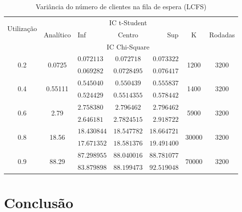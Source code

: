 \documentclass[a4paper]{article}
\begin{document}
\begin{table}[h!]
    \centering
    \begin{tabular}{|c|c|lcr|c|c|}\hline
        \multirow{2}{4.35em}{Utilização}
            & \multirow{3}{3.95em}{Analítico}
            & \multicolumn{3}{|c|}{IC t-Student}
            & \multirow{3}{1em}{K}
            & \multirow{3}{3.75em}{Rodadas} \\
        && Inf & Centro & Sup &&\\
        && \multicolumn{3}{|c|}{IC Chi-Square} &&\\\hline
        \multirow{2}{2em}{0.2}
            &\multirow{2}{3em}{0.0725}
            &$ 0.072113 $&$ 0.072718 $&$ 0.073322 $
            &\multirow{2}{2em}{1200} & \multirow{2}{2em}{3200}\\
            &&$ 0.069282 $&$ 0.0728495 $&$ 0.076417 $&&\\\hline
        \multirow{2}{2em}{0.4}
            &\multirow{2}{3em}{0.55111}
            &$ 0.545040 $&$ 0.550439 $&$ 0.555837 $
            &\multirow{2}{2em}{1400} & \multirow{2}{2em}{3200}\\
            &&$ 0.524429 $&$ 0.5514355 $&$ 0.578442 $&&\\\hline
        \multirow{2}{2em}{0.6}
            &\multirow{2}{2em}{2.79}
            &$ 2.758380 $&$ 2.796462 $&$ 2.796462 $
            &\multirow{2}{2em}{5900} & \multirow{2}{2em}{3200}\\
            &&$ 2.646181 $&$ 2.7824515 $&$ 2.918722 $&&\\\hline
        \multirow{2}{2em}{0.8}
            &\multirow{2}{2em}{18.56}
            &$ 18.430844 $&$ 18.547782 $&$ 18.664721 $
            &\multirow{2}{2em}{30000} & \multirow{2}{2em}{3200}\\
            &&$ 17.671352 $&$ 18.581376 $&$ 19.491400 $&&\\\hline
        \multirow{2}{2em}{0.9}
            &\multirow{2}{2em}{88.29}
            &$ 87.298955 $&$ 88.040016 $&$ 88.781077 $
            &\multirow{2}{2.5em}{70000} & \multirow{2}{2em}{3200}\\
            &&$ 83.879898 $&$ 88.199473 $&$ 92.519048 $&&\\\hline
    \end{tabular}
    \caption{Variância do número de clientes
    na fila de espera (LCFS)}
\end{table}

\newpage
\section{Conclusão}
\end{document}
